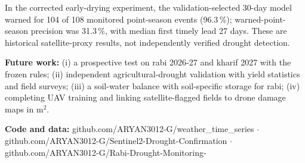 \documentclass[11pt,a4paper,oneside]{article}
\begin{document}
 In the corrected early-drying experiment, the validation-selected 30-day model warned for 104 of 108 monitored point-season events (96.3\,\%); warned-point-season precision was 31.3\,\%, with median first timely lead 27 days. These are historical satellite-proxy results, not independently verified drought detection.

\textbf{Future work:} (i) a prospective test on rabi 2026-27 and kharif 2027 with the frozen rules; (ii) independent agricultural-drought validation with yield statistics and field surveys; (iii) a soil-water balance with soil-specific storage for rabi; (iv) completing UAV training and linking satellite-flagged fields to drone damage maps in m$^2$.

\textbf{Code and data:} github.com/ARYAN3012-G/weather\_time\_series $\cdot$ github.com/ARYAN3012-G/Sentinel2-Drought-Confirmation $\cdot$ github.com/ARYAN3012-G/Rabi-Drought-Monitoring-

\end{document}

